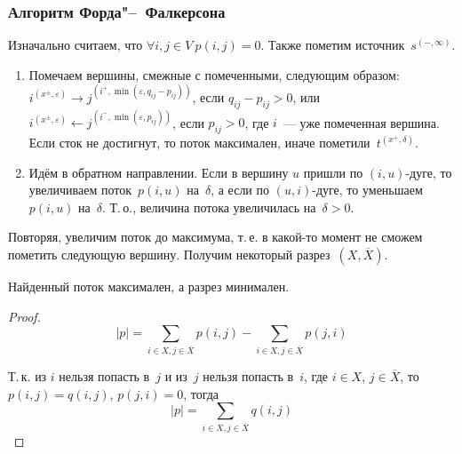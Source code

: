 \subsubsection{Алгоритм Форда"--~Фалкерсона}
Изначально считаем, что $\forall i, j \in V \ p(i, j) = 0$.
Также пометим источник~$s^{(-, \infty)}$.
\begin{enumerate}
	\item Помечаем вершины, смежные с помеченными, следующим образом: $i^{(x^\pm, \varepsilon)} \rightarrow j^{(i^+, \min(\varepsilon, q_{ij} - p_{ij}))}$, если $q_{ij} - p_{ij} > 0$, или $i^{(x^\pm, \varepsilon)} \leftarrow j^{(i^-, \min(\varepsilon, p_{ij}))}$, если $p_{ij} > 0$, где $i$~--- уже помеченная вершина.
	Если сток не достигнут, то поток максимален, иначе пометили~$t^{(x^+, \delta)}$.
	
	\item Идём в обратном направлении.
	Если в вершину $u$ пришли по $(i, u)$-дуге, то увеличиваем поток~$p(i, u)$ на~$\delta$, а если по $(u, i)$-дуге, то уменьшаем $p(i, u)$ на~$\delta$.
	Т.\,о., величина потока увеличилась на~$\delta > 0$.
\end{enumerate}

Повторяя, увеличим поток до максимума, т.\,е. в какой-то момент не сможем пометить следующую вершину.
Получим некоторый разрез~$(X, \overline X)$.

\begin{lemma}
Найденный поток максимален, а разрез минимален.
\end{lemma}
\begin{proof}
\begin{equation*}
|p| = \sum_{i \in X, j \in \overline X} p(i, j) - \sum_{i \in X, j \in \overline X} p(j, i)
\end{equation*}

Т.\,к. из $i$ нельзя попасть в~$j$ и из~$j$ нельзя попасть в~$i$, где $i \in X$, $j \in \overline X$, то $p(i, j) = q(i, j)$, $p(j, i) = 0$, тогда
\begin{equation*}
|p| = \sum_{i \in X, j \in \overline X} q(i, j)
\end{equation*}
\end{proof}